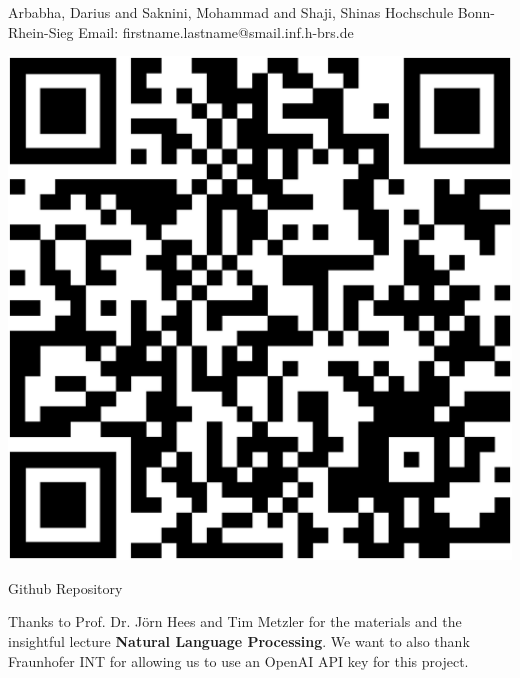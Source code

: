 {
	\vspace*{1cm}
	\begin{minipage}{0.75\linewidth}
		\vspace*{-2.5cm}
		Arbabha, Darius and Saknini, Mohammad and Shaji, Shinas\newline
		Hochschule Bonn-Rhein-Sieg\newline
		Email: firstname.lastname@smail.inf.h-brs.de\newline
	\end{minipage}
	\begin{minipage}{0.24\linewidth}
		\centering
		\vspace{-1.5cm}
		\begin{tikzfigure}
			\includegraphics[scale=0.125]{figures/qrcode.eps}
		\end{tikzfigure}
		Github Repository
	\end{minipage}
	\vspace*{-3cm}
	
}
{
	
	Thanks to Prof. Dr. Jörn Hees and Tim Metzler for the materials and the insightful lecture \textbf{Natural Language Processing}.\newline
	We want to also thank Fraunhofer INT for allowing us to use an OpenAI API key for this project.
}